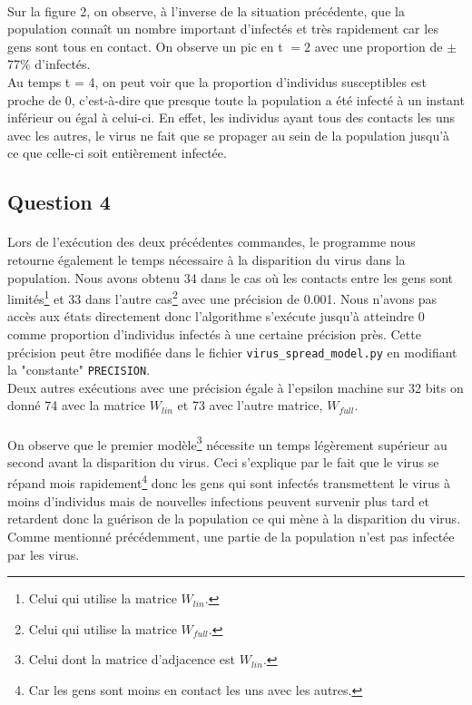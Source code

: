 \documentclass[a4paper, 12pt, oneside]{article}
\begin{document}
\paragraph{}Sur la figure 2, on observe, à l'inverse de la situation précédente, que la population connaît un nombre important d'infectés et très rapidement car les gens sont tous en contact. On observe un pic en t $= 2$ avec une proportion de $\pm$ 77$\%$ d'infectés.\\
Au temps t = 4, on peut voir que la proportion d'individus susceptibles est proche de 0, c'est-à-dire que presque toute la population a été infecté à un instant inférieur ou égal à celui-ci. En effet, les individus ayant tous des contacts les uns avec les autres, le virus ne fait que se propager au sein de la population jusqu'à ce que celle-ci soit entièrement infectée.

\subsection{Question 4}

\paragraph{}Lors de l'exécution des deux précédentes commandes, le programme nous retourne également le temps nécessaire à la disparition du virus dans la population. Nous avons obtenu 34 dans le cas où les contacts entre les gens sont limités\footnote{Celui qui utilise la matrice $W_{lin}$.} et 33 dans l'autre cas\footnote{Celui qui utilise la matrice $W_{full}$.} avec une précision de 0.001. Nous n'avons pas accès aux états directement donc l'algorithme s'exécute jusqu'à atteindre 0 comme proportion d'individus infectés à une certaine précision près. Cette précision peut être modifiée dans le fichier \texttt{virus\_spread\_model.py} en modifiant la "constante" \texttt{PRECISION}.\\
Deux autres exécutions avec une précision égale à l'epsilon machine sur 32 bits on donné 74 avec la matrice $W_{lin}$ et 73 avec l'autre matrice, $W_{full}$.
\paragraph{}On observe que le premier modèle\footnote{Celui dont la matrice d'adjacence est $W_{lin}$.} nécessite un temps légèrement supérieur au second avant la disparition du virus. Ceci s'explique par le fait que le virus se répand mois rapidement\footnote{Car les gens sont moins en contact les uns avec les autres.} donc les gens qui sont infectés transmettent le virus à moins d'individus mais de nouvelles infections peuvent survenir plus tard et retardent donc la guérison de la population ce qui mène à la disparition du virus. Comme mentionné précédemment, une partie de la population n'est pas infectée par les virus.
\end{document}
